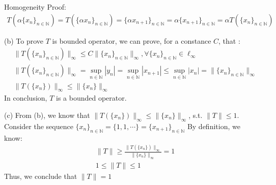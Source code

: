 \documentclass[a4paper,12pt]{article}
\newcommand{\N}{\mathbb{N}}
\begin{document}
Homogeneity Proof: \\
\begin{align*}
    T(\alpha \{x_n\}_{n \in \N}) = T(\{\alpha x_n\}_{n \in \N}) = \{\alpha x_{n+1}\}_{n \in \N} = \alpha \{x_{n+1}\}_{n \in \N} = \alpha T(\{x_n\}_{n \in \N})
\end{align*}

\vspace{1cm}
\noindent
(b) 
To prove \(T\) is bounded operator, we can prove, for a constance \(C\), that :
\begin{align*}
    &\|T(\{x_n\}_{n \in \N})\|_\infty \leq C\|\{x_n\}_{n \in \N}\|_\infty , \forall \{x_n\}_{n \in \N} \in \ell_\infty\\
    &\|T(\{x_n\}_{n \in \N})\|_\infty = \sup_{n\in\N}|y_n| = \sup_{n\in\N}|x_{n+1}| \leq \sup_{n\in\N}|x_n| = \|\{x_n\}_{n\in\N}\|_{\infty} \\
    &\|T(\{x_n\})\|_\infty \leq \|\{x_n\}\|_\infty
\end{align*}
In conclusion, \(T\) is a bounded operator.


\vspace{1cm}
\noindent
(c)
From (b), we know that \(\|T(\{x_n\})\|_\infty \leq \|\{x_n\}\|_\infty\), s.t. \(\|T\| \leq 1\). \\
Consider the sequence \(\{x_n\}_{n \in \N} = \{ 1, 1, \cdots\} = \{x_{n+1}\}_{n\in\N}\)
By definition, we know:
\begin{align*}
    &\|T\| \geq \frac{\|T(\{x_n\})\|_\infty}{\|\{x_n\}\|_\infty} = 1 \\
    &1\leq\|T\| \leq 1
\end{align*}
Thus, we conclude that \(\|T\| = 1\)
\end{document}

